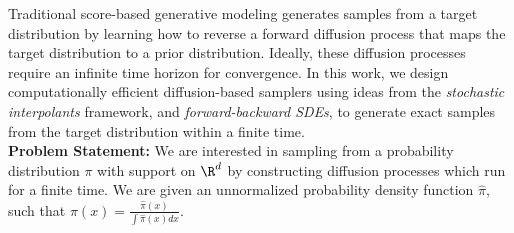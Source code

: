 Traditional score-based generative modeling generates samples from a target distribution by learning how to reverse a forward diffusion process that maps the target distribution to a prior distribution. Ideally, these diffusion processes require an infinite time horizon for convergence.
In this work, we design computationally efficient diffusion-based samplers using ideas from the \textit{stochastic interpolants} framework, and \textit{forward-backward SDEs}, to generate exact samples from the target distribution within a finite time.
\\[4pt]
\textbf{Problem Statement:}
We are interested in sampling from a probability distribution $\pi$ with support on $\R^d$ by constructing diffusion processes which run for a finite time. We are given an unnormalized probability density function $\hat{\pi}$, such that $\pi(x) = \frac{\hat{\pi}(x)}{\int\hat{\pi}(x)dx}$.

